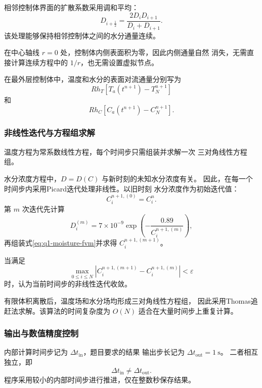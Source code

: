 \documentclass[12pt,a4paper]{article}
\begin{document}
相邻控制体界面的扩散系数采用调和平均：
\begin{equation}
D_{i+\frac12}
=
\frac{2D_iD_{i+1}}{D_i+D_{i+1}}.
\label{eq:q1-harmonic}
\end{equation}
该处理能够保持相邻控制体之间的水分通量连续。

在中心轴线 $r=0$ 处，控制体内侧表面积为零，因此内侧通量自然
消失，无需直接计算连续方程中的 $1/r$，也无需设置虚拟节点。

在最外层控制体中，温度和水分的表面对流通量分别写为
\begin{equation}
Rh_T\left[T_a(t^{n+1})-T_N^{n+1}\right]
\end{equation}
和
\begin{equation}
Rh_C\left[C_a(t^{n+1})-C_N^{n+1}\right].
\end{equation}

\subsubsection{非线性迭代与方程组求解}

温度方程为常系数线性方程，每个时间步只需组装并求解一次
三对角线性方程组。

水分浓度方程中，$D=D(C)$ 与新时刻的未知水分浓度有关。
因此，在每一个时间步内采用Picard迭代处理非线性。以旧时刻
水分浓度作为初始迭代值：
\begin{equation}
C_i^{n+1,(0)}=C_i^n.
\end{equation}
第 $m$ 次迭代先计算
\begin{equation}
D_i^{(m)}
=
7\times10^{-9}
\exp\left(
-\frac{0.89}{C_i^{n+1,(m)}}
\right),
\end{equation}
再组装式\eqref{eq:q1-moisture-fvm}并求得
$C_i^{n+1,(m+1)}$。

当满足
\begin{equation}
\max_{0\le i\le N}
\left|
C_i^{n+1,(m+1)}
-
C_i^{n+1,(m)}
\right|
<\varepsilon
\label{eq:q1-picard-stop}
\end{equation}
时，认为当前时间步的非线性迭代收敛。

有限体积离散后，温度场和水分场均形成三对角线性方程组，
因此采用Thomas追赶法求解。该算法的时间复杂度为
$O(N)$
适合在大量时间步上重复计算。

\subsubsection{输出与数值精度控制}

内部计算时间步记为 $\Delta t_{\mathrm{in}}$，题目要求的结果
输出步长记为 $\Delta t_{\mathrm{out}}=1\ \mathrm{s}$。
二者相互独立，即
\begin{equation}
\Delta t_{\mathrm{in}}
\neq
\Delta t_{\mathrm{out}}.
\end{equation}
程序采用较小的内部时间步进行推进，仅在整数秒保存结果。
\end{document}
